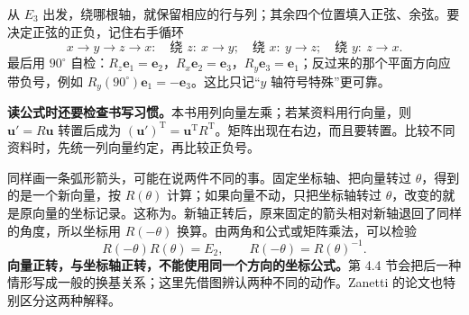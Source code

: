 \documentclass[a4paper,12pt,twoside,openany,fontset=none]{ctexbook}
\numberwithin{equation}{chapter}
\begin{document}
从 $E_3$ 出发，绕哪根轴，就保留相应的行与列；其余四个位置填入正弦、余弦。要决定正弦的正负，记住右手循环
\begin{equation}
 x\longrightarrow y\longrightarrow z\longrightarrow x:
 \quad\text{绕 }z:\ x\to y;\quad
 \text{绕 }x:\ y\to z;\quad
 \text{绕 }y:\ z\to x.
\end{equation}
最后用 $90^\circ$ 自检：$R_z\mathbf e_1=\mathbf e_2$，$R_x\mathbf e_2=\mathbf e_3$，$R_y\mathbf e_3=\mathbf e_1$；反过来的那个平面方向应带负号，例如 $R_y(90^\circ)\mathbf e_1=-\mathbf e_3$。这比只记“$y$ 轴符号特殊”更可靠。

\textbf{读公式时还要检查书写习惯。}本书用列向量左乘；若某资料用行向量，则 $\boldsymbol u'=R\boldsymbol u$ 转置后成为 $(\boldsymbol u')^{\mathrm T}=\boldsymbol u^{\mathrm T}R^{\mathrm T}$。矩阵出现在右边，而且要转置。比较不同资料时，先统一列向量约定，再比较正负号。

同样画一条弧形箭头，可能在说两件不同的事。固定坐标轴、把向量转过 $\theta$，得到的是一个新向量，按 $R(\theta)$ 计算；如果向量不动，只把坐标轴转过 $\theta$，改变的就是原向量的坐标记录。这称为。新轴正转后，原来固定的箭头相对新轴退回了同样的角度，所以坐标用 $R(-\theta)$ 换算。由两角和公式或矩阵乘法，可以检验
\begin{equation}
 R(-\theta)R(\theta)=E_2,\qquad R(-\theta)=R(\theta)^{-1}.
 \label{eq:four-active-passive}
\end{equation}
\textbf{向量正转，与坐标轴正转，不能使用同一个方向的坐标公式。}第 4.4 节会把后一种情形写成一般的换基关系；这里先借图辨认两种不同的动作。Zanetti 的论文也特别区分这两种解释。\cite{zanetti-rotations-2019}
\end{document}
